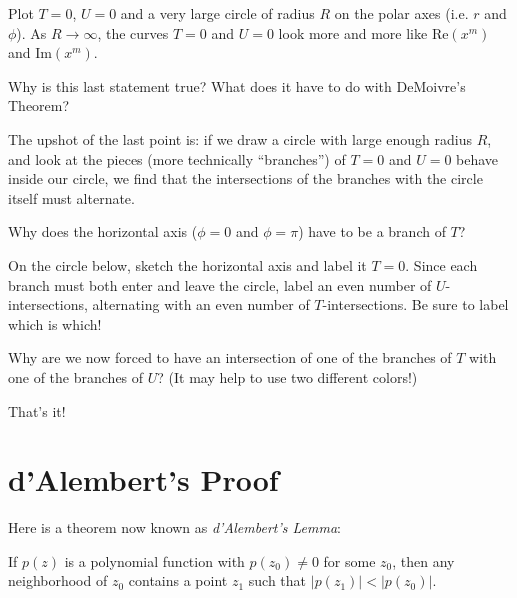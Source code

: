 \documentclass[nooutcomes]{ximera}
\begin{document}
Plot $T=0$, $U=0$ and a very large circle of radius $R$ on the polar axes (i.e. $r$ and $\phi$).  As $R\to \infty$, the curves $T=0$ and $U=0$ look more and more like $\text{Re}(x^m)$ and $\text{Im}(x^m)$.

\begin{question}
    Why is this last statement true?  What does it have to do with DeMoivre's Theorem?
\end{question}

The upshot of the last point is: if we draw a circle with large enough radius $R$, and look at the pieces (more technically ``branches'') of $T=0$ and $U=0$ behave inside our circle, we find that the intersections of the branches with the circle itself must alternate.

\begin{question}
    Why does the horizontal axis ($\phi = 0$ and $\phi = \pi$) have to be a branch of $T$?
\end{question}

On the circle below, sketch the horizontal axis and label it $T=0$.  Since each branch must both enter and leave the circle, label an even number of $U$-intersections, alternating with an even number of $T$-intersections.  Be sure to label which is which!

\begin{center}
\end{center}

\begin{question}
    Why are we now forced to have an intersection of one of the branches of $T$ with one of the branches of $U$? (It may help to use two different colors!)
\end{question}

That's it!

\section*{d'Alembert's Proof}

Here is a theorem now known as {\em d'Alembert's Lemma}:
\begin{lemma}
If $p(z)$ is a polynomial function with $p(z_0) \neq 0$ for some $z_0$, then any neighborhood of $z_0$ contains a point $z_1$ such that $\vert p(z_1) \vert < \vert p(z_0) \vert$.
\end{lemma}
\end{document}
